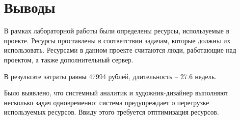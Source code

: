 \chapter{Выводы}

В рамках лабораторной работы были определены ресурсы, используемые в проекте. Ресурсы проставлены в соответствии задачам, которые должны их использовать. Ресурсами в данном проекте считаются люди, работающие над проектом, а также дополнительный сервер.

В результате затраты равны 47994 рублей, длительность -- 27.6 недель.

Было выявлено, что системный аналитик и художник-дизайнер выполняют несколько задач одновременно: система предупреждает о перегрузке используемых ресурсов. Ввиду этого требуется отптимизация ресурсов.